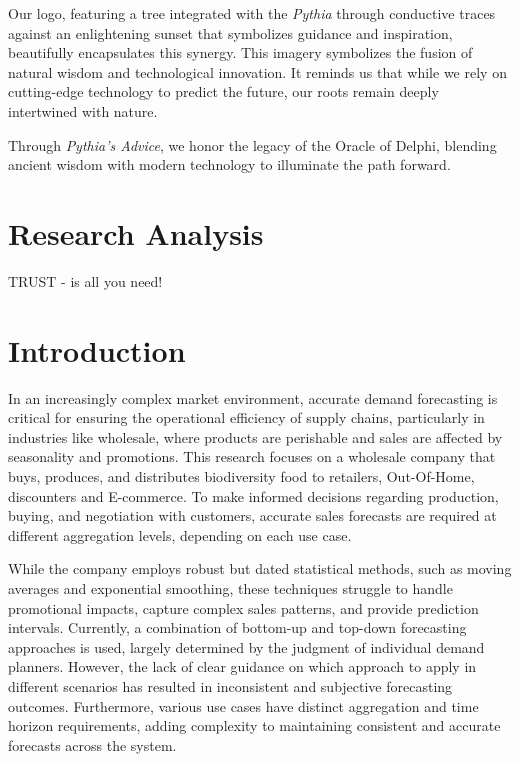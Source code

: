 \documentclass[
  american,
  10,
  a4paper,
]{book}
\theoremstyle{definition}
\theoremstyle{remark}
\begin{document}
\hfill\break
Our logo, featuring a tree integrated with the \emph{Pythia} through
conductive traces against an enlightening sunset that symbolizes
guidance and inspiration, beautifully encapsulates this synergy. This
imagery symbolizes the fusion of natural wisdom and technological
innovation. It reminds us that while we rely on cutting-edge technology
to predict the future, our roots remain deeply intertwined with nature.

Through \emph{Pythia's Advice}, we honor the legacy of the Oracle of
Delphi, blending ancient wisdom with modern technology to illuminate the
path forward.

\chapter{Research Analysis}\label{research-analysis}

TRUST - is all you need!

\hfill\break

\chapter{Introduction}\label{sec-00-introduction}

In an increasingly complex market environment, accurate demand
forecasting is critical for ensuring the operational efficiency of
supply chains, particularly in industries like wholesale, where products
are perishable and sales are affected by seasonality and promotions.
This research focuses on a wholesale company that buys, produces, and
distributes biodiversity food to retailers, Out-Of-Home, discounters and
E-commerce. To make informed decisions regarding production, buying, and
negotiation with customers, accurate sales forecasts are required at
different aggregation levels, depending on each use case.

While the company employs robust but dated statistical methods, such as
moving averages and exponential smoothing, these techniques struggle to
handle promotional impacts, capture complex sales patterns, and provide
prediction intervals. Currently, a combination of bottom-up and top-down
forecasting approaches is used, largely determined by the judgment of
individual demand planners. However, the lack of clear guidance on which
approach to apply in different scenarios has resulted in inconsistent
and subjective forecasting outcomes. Furthermore, various use cases have
distinct aggregation and time horizon requirements, adding complexity to
maintaining consistent and accurate forecasts across the system.
\end{document}
